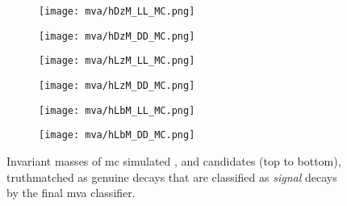 \begin{figure}[htbp]
    \centering
    \begin{subfigure}{.49\textwidth}
        \centering
        \texttt{[image: mva/hDzM\_LL\_MC.png]}
    \end{subfigure}
    \begin{subfigure}{.49\textwidth}
        \centering
        \texttt{[image: mva/hDzM\_DD\_MC.png]}
    \end{subfigure}
    \par\bigskip 
    \begin{subfigure}{.49\textwidth}
        \centering
        \texttt{[image: mva/hLzM\_LL\_MC.png]}
    \end{subfigure}
    \begin{subfigure}{.49\textwidth}
        \centering
        \texttt{[image: mva/hLzM\_DD\_MC.png]}
    \end{subfigure}
    \par\bigskip 
    \begin{subfigure}{.49\textwidth}
        \centering
        \texttt{[image: mva/hLbM\_LL\_MC.png]}
    \end{subfigure}
    \begin{subfigure}{.49\textwidth}
        \centering
        \texttt{[image: mva/hLbM\_DD\_MC.png]}
    \end{subfigure}
    \caption{Invariant masses of \gls{mc} simulated \Dz, \Lz and \Lb candidates (top to bottom), \gls{truthmatched} as genuine \decay{\Lb}{\Dz\Lz} decays that are classified as \textit{signal} \decay{\Lb}{\Dz\Lz} decays by the final \gls{mva} classifier.}
    \label{fig:mva_hm_MC}
\end{figure}
